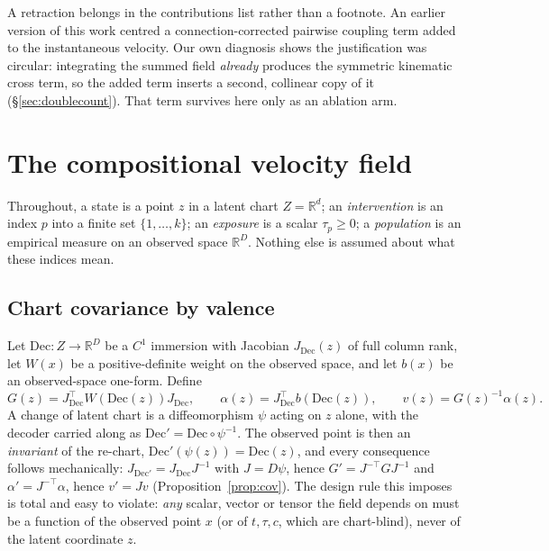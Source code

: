 \documentclass{article}
\newcommand{\Rd}{\mathbb{R}^{d}}
\newcommand{\RD}{\mathbb{R}^{D}}
\newcommand{\Dec}{\mathrm{Dec}}
\begin{document}
A retraction belongs in the contributions list rather than a footnote. An earlier version of
this work centred a connection-corrected pairwise coupling term added to the instantaneous
velocity. Our own diagnosis shows the justification was circular: integrating the summed
field \emph{already} produces the symmetric kinematic cross term, so the added term inserts a
second, collinear copy of it (\S\ref{sec:doublecount}). That term survives here only as an
ablation arm.

\section{The compositional velocity field}
\label{sec:method}

Throughout, a state is a point $z$ in a latent chart $Z = \Rd$; an \emph{intervention} is an
index $p$ into a finite set $\{1, \dots, k\}$; an \emph{exposure} is a scalar
$\tau_{p} \ge 0$; a \emph{population} is an empirical measure on an observed space
$\RD$. Nothing else is assumed about what these indices mean.

\subsection{Chart covariance by valence}
\label{sec:pullback}

Let $\Dec : Z \to \RD$ be a $C^{1}$ immersion with Jacobian $J_{\Dec}(z)$ of full column
rank, let $W(x)$ be a positive-definite weight on the observed space, and let $b(x)$ be an
observed-space one-form. Define
\begin{equation}
G(z) = J_{\Dec}^{\top} W(\Dec(z)) J_{\Dec}, \qquad
\alpha(z) = J_{\Dec}^{\top} b(\Dec(z)), \qquad
v(z) = G(z)^{-1}\alpha(z).
\label{eq:pullback}
\end{equation}
A change of latent chart is a diffeomorphism $\psi$ acting on $z$ alone, with the decoder
carried along as $\Dec' = \Dec \circ \psi^{-1}$. The observed point is then an
\emph{invariant} of the re-chart, $\Dec'(\psi(z)) = \Dec(z)$, and every consequence follows
mechanically: $J_{\Dec'} = J_{\Dec} J^{-1}$ with $J = D\psi$, hence
$G' = J^{-\top} G J^{-1}$ and $\alpha' = J^{-\top}\alpha$, hence $v' = J v$
(Proposition~\ref{prop:cov}). The design rule this imposes is total and easy to violate:
\emph{any} scalar, vector or tensor the field depends on must be a function of the observed
point $x$ (or of $t, \tau, c$, which are chart-blind), never of the latent coordinate $z$.
\end{document}
